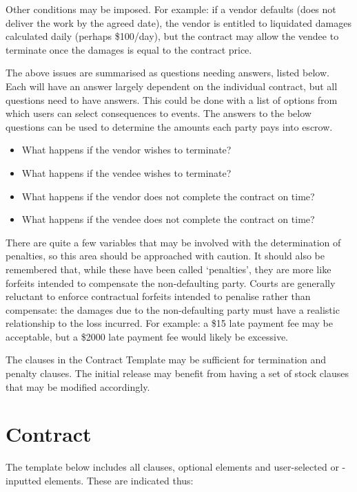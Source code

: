\documentclass[a4paper,12pt]{article}
\begin{document}
Other conditions may be imposed. For example: if a vendor defaults (does not deliver the work by the agreed date), the vendor is entitled to liquidated damages calculated daily (perhaps \$100/day), but the contract may allow the vendee to terminate once the damages is equal to the contract price.

The above issues are summarised as questions needing answers, listed below. Each will have an answer largely dependent on the individual contract, but all questions need to have answers. This could be done with a list of options from which users can select consequences to events. The answers to the below questions can be used to determine the amounts each party pays into escrow.

\begin{itemize}
	\item What happens if the vendor wishes to terminate?
	\item What happens if the vendee wishes to terminate?
	\item What happens if the vendor does not complete the contract on time?
	\item What happens if the vendee does not complete the contract on time?
\end{itemize}

There are quite a few variables that may be involved with the determination of penalties, so this area should be approached with caution. It should also be remembered that, while these have been called `penalties', they are more like forfeits intended to compensate the non-defaulting party. Courts are generally reluctant to enforce contractual forfeits intended to penalise rather than compensate: the damages due to the non-defaulting party must have a realistic relationship to the loss incurred. For example: a \$15 late payment fee may be acceptable, but a \$2000 late payment fee would likely be excessive.

The clauses in the Contract Template may be sufficient for termination and penalty clauses. The initial release may benefit from having a set of stock clauses that may be modified accordingly.

\section{Contract}

The template below includes all clauses, optional elements and user-selected or -inputted elements. These are indicated thus:
\end{document}
